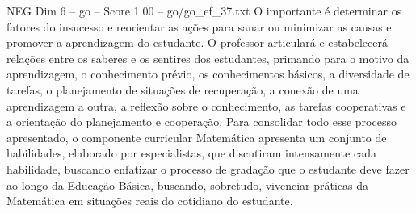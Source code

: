 \begin{textsample}{NEG Dim 6 – go – Score 1.00 – go/go\_ef\_37.txt}
O importante é determinar os fatores do insucesso e reorientar as ações para sanar ou minimizar as causas e promover a aprendizagem do estudante.
O professor articulará e estabelecerá relações entre os saberes e os sentires dos estudantes, primando para o motivo da aprendizagem, o conhecimento prévio, os conhecimentos básicos, a diversidade de tarefas, o planejamento de situações de recuperação, a conexão de uma aprendizagem a outra, a reflexão sobre o conhecimento, as tarefas cooperativas e a orientação do planejamento e cooperação.
Para consolidar todo esse processo apresentado, o componente curricular Matemática apresenta um conjunto de habilidades, elaborado por especialistas, que discutiram intensamente cada habilidade, buscando enfatizar o processo de gradação que o estudante deve fazer ao longo da Educação Básica, buscando, sobretudo, vivenciar práticas da Matemática em situações reais do cotidiano do estudante.

\end{textsample}
